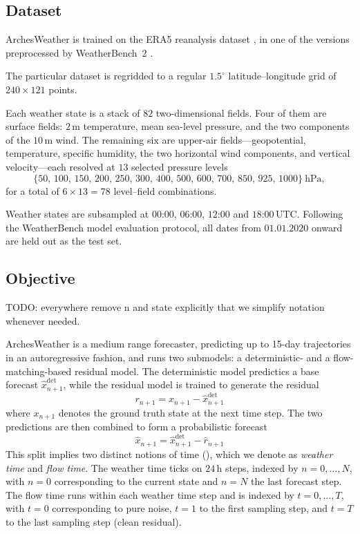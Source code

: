 \subsection{Dataset}
ArchesWeather is trained on the ERA5 reanalysis dataset \parencite{hersbach2020era5}, in one of the versions preprocessed by WeatherBench~2 \parencite{rasp2024weatherbench2}. 

The particular dataset is regridded to a regular $1.5^\circ$ latitude--longitude grid of $240 \times 121$ points.

Each weather state is a stack of $82$ two-dimensional fields. Four of them are surface fields: $2$\,m temperature, mean sea-level pressure, and the two components of the $10$\,m wind. The remaining six are upper-air fields---geopotential, temperature, specific humidity, the two horizontal wind components, and vertical velocity---each resolved at $13$ selected pressure levels
$$
\{50,\,100,\,150,\,200,\,250,\,300,\,400,\,500,\,600,\,700,\,850,\,925,\,1000\}\ \mathrm{hPa},
$$
for a total of $6 \times 13 = 78$ level--field combinations.

Weather states are subsampled at $00$:$00$, $06$:$00$, $12$:$00$ and $18$:$00$\,UTC. Following the WeatherBench model evaluation protocol, all dates from $01.01.2020$ onward are held out as the test set.

\subsection{Objective}
TODO: everywhere remove n and state explicitly that we simplify notation whenever needed.

ArchesWeather is a medium range forecaster, predicting up to 15-day trajectories in an autoregressive fashion, and runs two submodels: a deterministic- and a flow-matching-based residual model.
The deterministic model predictics a base forecast $\hat{x}^{\text{det}}_{n+1}$, while the residual model is trained to generate the residual 
$$
    r_{n+1} = x_{n+1} - \hat{x}^{\text{det}}_{n+1}
$$
where $x_{n+1}$ denotes the ground truth state at the next time step.
The two predictions are then combined to form a probabilistic forecast 
$$
    \hat{x}_{n+1} = \hat{x}^{\text{det}}_{n+1} - \hat{r}_{n+1}
$$
This split implies two distinct notions of time (), which we denote as \emph{weather time} and \emph{flow time}.
The weather time ticks on $24$\,h steps, indexed by $n=0,\dots,N$, with $n=0$ corresponding to the current state and $n=N$ the last forecast step.
The flow time runs within each weather time step and is indexed by $t=0,\dots,T$, with $t=0$ corresponding to pure noise, $t=1$ to the first sampling step, and $t=T$ to the last sampling step (clean residual).

